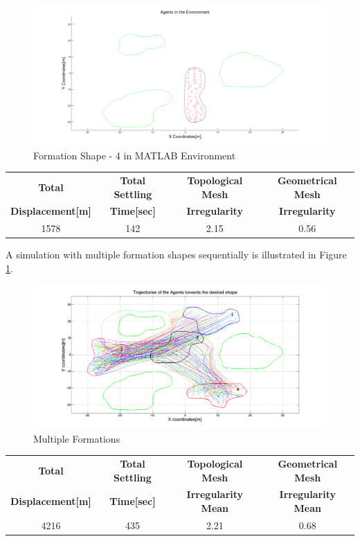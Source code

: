 \begin{figure}[H]
\caption{Formation Shape - 4 in MATLAB Environment}
\centerline{\includegraphics[scale = 0.32]{4}}
\end{figure} 
			
\begin{center}
 \label{perf_shape4} 
\begin{tabular}{||c| c |c |c ||}
\hline
\textbf{Total}  & \textbf{Total Settling} & \textbf{Topological Mesh} & \textbf{Geometrical Mesh} \\ \textbf{Displacement[m]} & \textbf{Time[sec]}& \textbf{Irregularity} & \textbf{Irregularity} \\
\hline
1578 & 142 &  2.15& 0.56\\
\hline
\end{tabular}
\end{center}
		
A simulation with multiple formation shapes sequentially is illustrated in Figure \ref{multiple_formation_ref}.

\begin{figure}[H]
\caption{Multiple Formations} \label{multiple_formation_ref}
\centerline{\includegraphics[scale = 0.33]{multiple_formation}}
\end{figure} 
		
\begin{center}
 \label{perf_multiple} 
\begin{tabular}{||c| c |c |c ||}
\hline
\textbf{Total}  & \textbf{Total Settling} & \textbf{Topological Mesh} & \textbf{Geometrical Mesh} \\ \textbf{Displacement[m]} & \textbf{Time[sec]}& \textbf{Irregularity Mean} & \textbf{Irregularity Mean} \\
\hline
4216 & 435 &  2.21& 0.68\\
\hline
\end{tabular}
\end{center}
		
